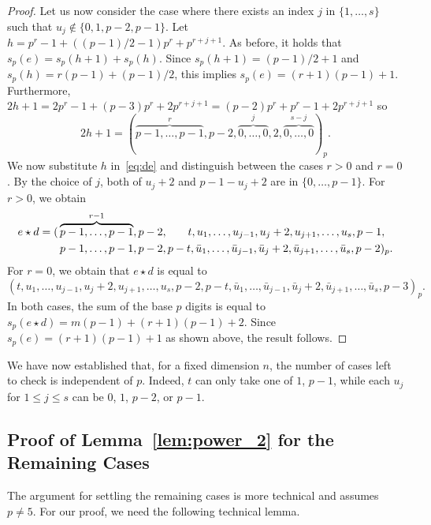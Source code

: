\documentclass[12pt]{article}
\newcommand{\comp}[1]{\bar{#1}}
\newcommand{\wt}{s_p}
\begin{document}
\begin{proof}
Let us now consider the case where there exists an index $j$ in $\{1,\dots,s\}$ such that $u_j \notin \{0,1,p-2,p-1\}$. Let $h = p^r - 1 + ((p-1)/2-1)p^r + p^{r+j+1}$. As before, it holds that $\wt(e) = \wt(h+1) + \wt(h)$. Since $\wt(h + 1) = (p - 1) / 2 + 1$ and $\wt(h) = r(p - 1) + (p - 1)/2$, this implies $\wt(e) = (r + 1)(p - 1) + 1$.
Furthermore, $2h + 1 = 2p^r - 1 + (p - 3)p^r + 2 p^{r + j + 1} = (p - 2)p^r + p^r - 1 + 2p^{r + j + 1}$ so
\begin{equation*}
2h + 1 = (\overbrace{p - 1, \ldots, p - 1}^r, p - 2, \overbrace{0, \ldots, 0}^j, 2, \overbrace{0, \ldots, 0}^{s - j})_p.
\end{equation*}
We now substitute $h$ in~\eqref{eq:de} and distinguish between the cases $r>0$ and $r= 0$. By the choice of $j$, both of $u_j+2$ and $p-1-u_j+2$ are in $\{0,\dots,p-1\}$. For $r>0$, we obtain
\begin{align*}
e \star d = (&\overbrace{p-1,\dots,p-1}^{r-1},p-2,\hphantom{p -\;\;} t,u_1,\dots,u_{j-1},u_j+2,u_{j+1},\dots,u_s,p-1,\\
    &\,p-1,\dots,p-1,p-2,p-t,\comp{u}_1,\dots,\comp{u}_{j-1},\comp{u}_{j}+2,
    \comp{u}_{j+1},\dots,\comp{u}_s,p-2)_p.
\end{align*}
For $r = 0$, we obtain that $e \star d$ is equal to
\begin{equation*}
    (t,u_1,\dots,u_{j-1},u_j+2,u_{j+1},\dots,u_s,p-2,
    p-t,\comp{u}_1,\dots,\comp{u}_{j-1},\comp{u}_{j}+2,
    \comp{u}_{j+1},\dots,\comp{u}_s,p-3)_p.
\end{equation*}
In both cases, the sum of the base $p$ digits is equal to $\wt(e \star d) = m(p-1)+ (r+1)(p-1)+2$. Since $\wt(e) = (r+1)(p-1)+1$ as shown above, the result follows.
\end{proof}

We have now established that, for a fixed dimension $n$, the number of cases left to check is independent of $p$. Indeed, $t$ can only take one of $1$, $p-1$, while each $u_j$ for $1 \leq j \leq s$ can be $0$, $1$, $p-2$, or $p-1$. 

\subsection{Proof of Lemma~\ref{lem:power_2} for the Remaining Cases}

The argument for settling the remaining cases is more technical and assumes $p \neq 5$. For our proof, we need the following technical lemma.
\end{document}
